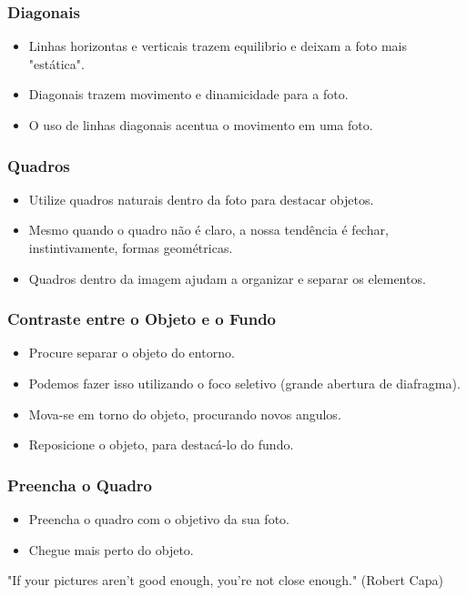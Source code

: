 \begin{frame}
    \frametitle{Diagonais}
    \begin{itemize}
      \item Linhas horizontas e verticais trazem equilibrio e deixam a foto mais "estática".
      \item Diagonais trazem movimento e dinamicidade para a foto.
      \item O uso de linhas diagonais acentua o movimento em uma foto.
    \end{itemize}
\end{frame}

\begin{frame}
    \frametitle{Quadros}
    \begin{itemize}
      \item Utilize quadros naturais dentro da foto para destacar objetos.
      \item Mesmo quando o quadro não é claro, a nossa tendência é fechar, instintivamente,
      formas geométricas.
      \item Quadros dentro da imagem ajudam a organizar e separar os elementos.
    \end{itemize}
\end{frame}

\begin{frame}
    \frametitle{\Large Contraste entre o Objeto e o Fundo}
    \begin{itemize}
      \item Procure separar o objeto do entorno.
      \item Podemos fazer isso utilizando o foco seletivo (grande abertura de diafragma).
      \item Mova-se em torno do objeto, procurando novos angulos.
      \item Reposicione o objeto, para destacá-lo do fundo.
    \end{itemize}
\end{frame}

\begin{frame}
    \frametitle{Preencha o Quadro}
    \begin{itemize}
      \item Preencha o quadro com o objetivo da sua foto.
      \item Chegue mais perto do objeto.
    \end{itemize}
    \begin{center}
      "If your pictures aren’t good enough, you’re not close enough." (Robert Capa)
    \end{center}
\end{frame}


